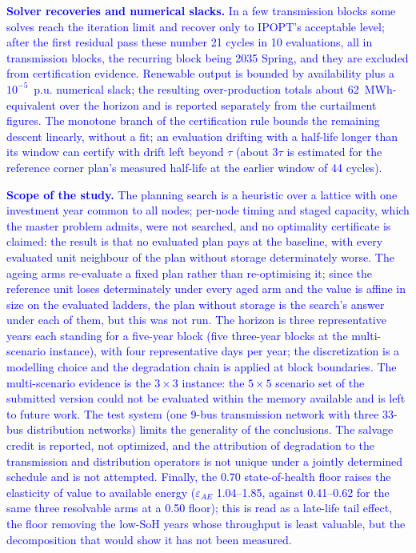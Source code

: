 \documentclass[preprint,12pt]{elsarticle}
\begin{document}
\textcolor{blue}{
    \textbf{Solver recoveries and numerical slacks.} In a few transmission blocks some solves reach the iteration limit and recover only to IPOPT's acceptable level; after the first residual pass these number 21 cycles in 10 evaluations, all in transmission blocks, the recurring block being 2035 Spring, and they are excluded from certification evidence. Renewable output is bounded by availability plus a $10^{-5}$~p.u. numerical slack; the resulting over-production totals about 62~MWh-equivalent over the horizon and is reported separately from the curtailment figures. The monotone branch of the certification rule bounds the remaining descent linearly, without a fit; an evaluation drifting with a half-life longer than its window can certify with drift left beyond $\tau$ (about $3\tau$ is estimated for the reference corner plan's measured half-life at the earlier window of 44 cycles).
}

\textcolor{blue}{
    \textbf{Scope of the study.} The planning search is a heuristic over a lattice with one investment year common to all nodes; per-node timing and staged capacity, which the master problem admits, were not searched, and no optimality certificate is claimed: the result is that no evaluated plan pays at the baseline, with every evaluated unit neighbour of the plan without storage determinately worse. The ageing arms re-evaluate a fixed plan rather than re-optimising it; since the reference unit loses determinately under every aged arm and the value is affine in size on the evaluated ladders, the plan without storage is the search's answer under each of them, but this was not run. The horizon is three representative years each standing for a five-year block (five three-year blocks at the multi-scenario instance), with four representative days per year; the discretization is a modelling choice and the degradation chain is applied at block boundaries. 
    The multi-scenario evidence is the $3 \times 3$ instance: the $5 \times 5$ scenario set of the submitted version could not be evaluated within the memory available and is left to future work.
    The test system (one 9-bus transmission network with three 33-bus distribution networks) limits the generality of the conclusions. The salvage credit is reported, not optimized, and the attribution of degradation to the transmission and distribution operators is not unique under a jointly determined schedule and is not attempted. Finally, the 0.70 state-of-health floor raises the elasticity of value to available energy ($\varepsilon_{AE}$ 1.04--1.85, against 0.41--0.62 for the same three resolvable arms at a 0.50 floor); this is read as a late-life tail effect, the floor removing the low-SoH years whose throughput is least valuable, but the decomposition that would show it has not been measured.
}
\end{document}
